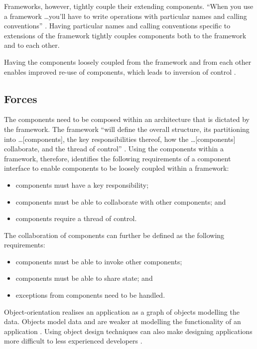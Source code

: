 \documentclass[prodmode]{style/acmlarge}
\begin{document}
Frameworks, however, tightly couple their extending components.  ``When you use a
framework \ldots you'll have to write operations with particular names and
calling conventions'' \cite[p. 27]{gof}.  Having particular names and calling
conventions specific to extensions of the framework  tightly couples components
both to the framework and to each other.

Having the components loosely coupled from the framework and from each other
enables improved re-use of components, which leads to inversion of control \cite{gof}.


\subsection{Forces}

The components need to be composed within an architecture that is dictated by
the framework.  The framework ``will define the overall structure, its
partitioning into \ldots [components], the key responsibilities thereof, how the
\ldots [components] collaborate, and the thread of control'' \cite[p.26]{gof}.
Using the components within a framework, therefore, identifies the following
requirements of a component interface to enable components to be loosely coupled
within a framework:
\begin{itemize}
  \item components must have a key responsibility;
  \item components must be able to collaborate with other components; and
  \item components require a thread of control.
\end{itemize}

The collaboration of components can further be defined as the following
requirements:
\begin{itemize}
  \item components must be able to invoke other components;
  \item components must be able to share state; and
  \item exceptions from components need to be handled.
\end{itemize}

Object-orientation realises an application as a graph of objects modelling the
data.  Objects model data and are weaker at modelling the functionality of an
application \cite{oo-behaviour}.  Using object design techniques can also make
designing applications more difficult to less experienced developers
\cite{oo-design}.
\end{document}

